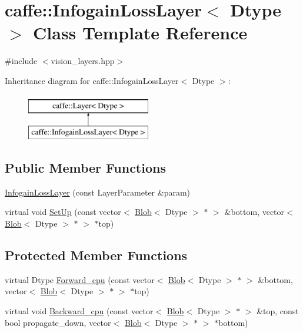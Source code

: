 \hypertarget{classcaffe_1_1_infogain_loss_layer}{\section{caffe\+:\+:Infogain\+Loss\+Layer$<$ Dtype $>$ Class Template Reference}
\label{classcaffe_1_1_infogain_loss_layer}
}


{\ttfamily \#include $<$vision\+\_\+layers.\+hpp$>$}

Inheritance diagram for caffe\+:\+:Infogain\+Loss\+Layer$<$ Dtype $>$\+:\begin{figure}[H]
\begin{center}
\leavevmode
\includegraphics[height=2.000000cm]{classcaffe_1_1_infogain_loss_layer}
\end{center}
\end{figure}
\subsection*{Public Member Functions}
\begin{DoxyCompactItemize}
\item 
\hyperlink{classcaffe_1_1_infogain_loss_layer_ac2269ba8dc7d18fa8fab90ea9f295784}{Infogain\+Loss\+Layer} (const Layer\+Parameter \&param)
\item 
virtual void \hyperlink{classcaffe_1_1_infogain_loss_layer_a22a1826f68b20911bcd2941e2284fd9e}{Set\+Up} (const vector$<$ \hyperlink{classcaffe_1_1_blob}{Blob}$<$ Dtype $>$ $\ast$ $>$ \&bottom, vector$<$ \hyperlink{classcaffe_1_1_blob}{Blob}$<$ Dtype $>$ $\ast$ $>$ $\ast$top)
\end{DoxyCompactItemize}
\subsection*{Protected Member Functions}
\begin{DoxyCompactItemize}
\item 
virtual Dtype \hyperlink{classcaffe_1_1_infogain_loss_layer_ab5a8e36c29baa36e34b81a06d04043b6}{Forward\+\_\+cpu} (const vector$<$ \hyperlink{classcaffe_1_1_blob}{Blob}$<$ Dtype $>$ $\ast$ $>$ \&bottom, vector$<$ \hyperlink{classcaffe_1_1_blob}{Blob}$<$ Dtype $>$ $\ast$ $>$ $\ast$top)
\item 
virtual void \hyperlink{classcaffe_1_1_infogain_loss_layer_a3fea9231eb9c3f1cd2f3989c54e475a8}{Backward\+\_\+cpu} (const vector$<$ \hyperlink{classcaffe_1_1_blob}{Blob}$<$ Dtype $>$ $\ast$ $>$ \&top, const bool propagate\+\_\+down, vector$<$ \hyperlink{classcaffe_1_1_blob}{Blob}$<$ Dtype $>$ $\ast$ $>$ $\ast$bottom)
\end{DoxyCompactItemize}
